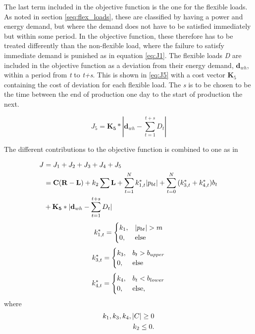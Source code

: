 The last term included in the objective function is the one for the flexible loads. As noted in section \ref{seq:flex_loads}, these are classified by having a power and energy demand, but where the demand does not have to be satisfied immediately but within some period. In the objective function, these therefore has to be treated differently than the non-flexible load, where the failure to satisfy immediate demand is punished as in equation \ref{eq:J1}. The flexible loads \textit{D} are included in the objective function as a deviation from their energy demand, $\mathbf{d}_{wh}$, within a period from \textit{t} to \textit{t+s}. This is shown in \ref{eq:J5} with a cost vector $\mathbf{K}_5$ containing the cost of deviation for each flexible load. The \textit{s} is to be chosen to be the time between the end of production one day to the start of production the next.

\begin{equation}
    J_5 = \mathbf{K_5}*|\mathbf{d}_{wh}-\sum_{t=1}^{t+s}{D_t}|
    \label{eq:J5}
\end{equation}

The different contributions to the objective function is combined to one as in 

\begin{align}
    J &= J_1 + J_2 + J_3 + J_4 + J_5\notag\\
    &= \mathbf{C}(\mathbf{R}-\mathbf{L}) + k_2\sum\mathbf{L} + \sum_{t=1}^{N}{k_{1,t}^*|p_{bt}|} + \sum_{t=0}^{N}{(k_{3,t}^*+k_{4,t}^*)b_t }\\
    &+ \mathbf{K_5}*|\mathbf{d}_{wh}-\sum_{t=1}^{t+s}{D_t}|
    \label{eq:objective_function}
\end{align}
\begin{equation}
    k_{1,t}^* =  \begin{cases}
            k_1,& |p_{bt}|>m\\
            0, & \text{else}
            \end{cases}
            \notag
\end{equation}
\begin{equation}
    k_{3,t}^* =  \begin{cases}
            k_3,& b_{t}>b_{upper}\\
            0, & \text{else}
            \end{cases}
            \notag
\end{equation}
\begin{equation}
    k_{4,t}^* =  \begin{cases}
            k_4,& b_{t}<b_{lower}\\
            0, & \text{else},
            \end{cases}
            \notag
\end{equation}
where  
\begin{align}
    k_1,k_3,k_4,|C|\geq 0\notag\\
    k_2 \leq 0. \notag
\end{align}

